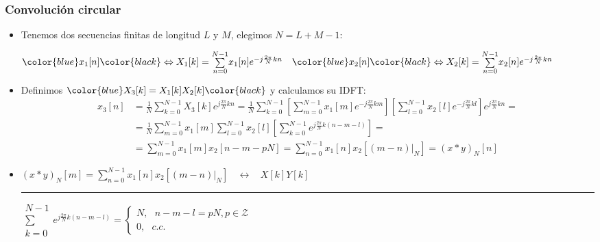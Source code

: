 \documentclass{beamer}
\numberwithin{section}{part}
\begin{document}
\begin{frame}
  \frametitle{Convolución circular}
  
  \footnotesize
  \begin{itemize}
    \item Tenemos dos secuencias finitas de longitud $L$ y $M$, elegimos $N=L+M-1$:
    \begin{center}
      $\color{blue}x_1[n]\color{black} \Leftrightarrow X_1[k]=\substack{N-1\\\sum\\n=0} x_1[n]e^{-j \frac{2\pi}{N}kn}
      \quad 
      \color{blue}x_2[n]\color{black} \Leftrightarrow X_2[k]=\substack{N-1\\\sum\\n=0}x_2[n]e^{-j \frac{2\pi}{N}kn}$
    \end{center}
    
    \item Definimos $\color{blue}X_3[k]=X_1[k]X_2[k]\color{black}$ y calculamos su IDFT:\scriptsize
    \[
    \begin{aligned}
      x_3[n] &= \frac{1}{N}\sum_{k=0}^{N-1} X_3[k]e^{j \frac{2\pi}{N}kn}=\frac{1}{N}\sum_{k=0}^{N-1} \left[\sum_{m=0}^{N-1}x_1[m]e^{-j \frac{2\pi}{N}km} \right] \left[\sum_{l=0}^{N-1}x_2[l]e^{-j \frac{2\pi}{N}kl} \right]e^{j \frac{2\pi}{N}kn}=\\
             &= \frac{1}{N}\sum_{m=0}^{N-1} x_1[m]  \sum_{l=0}^{N-1}x_2[l] \left[ \sum_{k=0}^{N-1}e^{j \frac{2\pi}{N}k(n-m-l)} \right ]=\\
             &= \sum_{m=0}^{N-1} x_1[m] x_2[n-m-pN]=\sum_{n=0}^{N-1} x_1[n] x_2[(m-n)|_N]=(x*y)_N[n]
    \end{aligned}
    \]

    \item \alert{$(x*y)_N[m]=\sum_{n=0}^{N-1} x_1[n] x_2[(m-n)|_N]  \:\:\:\:   \leftrightarrow \:\:\:\: X[k]Y[k]$}
    
    \rule{11cm}{0.4pt}
    
    $\substack{N-1\\\sum\\k=0}e^{j \frac{2\pi}{N}k(n-m-l)} = \left \{\begin{array}{l} N,   \:\:\: n-m-l=pN, p\in \mathcal{Z} \\ 0,  \:\:\: c.c. \end{array}\right .$  
  \end{itemize}
\end{frame}
  
\end{document}
